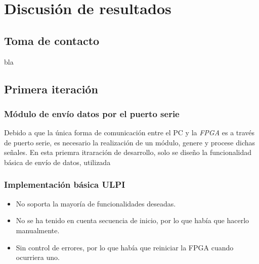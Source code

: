 \chapter{Discusión de resultados}
\label{ch:discusion-resultados}

\section{Toma de contacto}
bla

\section{Primera iteración}




\subsection{Módulo de envío datos por el puerto serie}
Debido a que la única forma de comunicación entre el PC y la \emph{FPGA} es a través de puerto serie, es necesario la realización de un módulo, genere y procese dichas señales. En esta priemra itraración de desarrollo, solo se diseño la funcionalidad básica de envío de datos, utilizada 

\subsection{Implementación básica ULPI}
\begin{itemize}
    \item No soporta la mayoría de funcionalidades deseadas.
    \item No se ha tenido en cuenta secuencia de inicio, por lo que había que hacerlo manualmente.
    \item Sin control de errores, por lo que había que reiniciar la FPGA cuando ocurriera uno.
\end{itemize}

